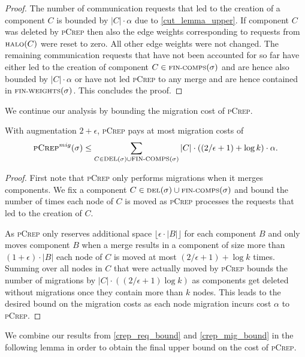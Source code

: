 \documentclass[a4paper,UKenglish,cleveref, autoref, thm-restate,authorcolumns]{lipics-v2019}
\newcommand{\adjDel}{\textsc{pCrep}}
\newcommand{\del}{\text{\scriptsize DEL}}
\newcommand{\halo}{\text{\scriptsize HALO}}
\newcommand{\finalComps}{\text{\scriptsize FIN-COMPS}}
\newcommand{\finalWeights}{\text{\scriptsize FIN-WEIGHTS}}
\begin{document}
\begin{proof}
	The number of communication requests that led to the creation of a component $C$ is bounded by $|C|\cdot\alpha$ due to \cref{cut_lemma_upper}.
	If component $C$ was deleted by \adjDel{} then also the edge weights corresponding to requests from $\halo(C)$ were reset to zero. All other edge weights were not changed. The remaining communication requests that have not been accounted for so far have either led to the creation of component $C\in\finalComps(\sigma)$ and are hence also bounded by $|C|\cdot\alpha$ or have not led \adjDel{} to any merge and are hence contained in $\finalWeights(\sigma)$. This concludes the proof.
\end{proof}

We continue our analysis by bounding the migration cost of \adjDel{}.

\begin{lemma}
	\label{crep_mig_bound}
	With augmentation $2+\epsilon$, \adjDel{} pays at most migration costs of
	\begin{align*}
	\adjDel^{mig}(\sigma)\leq\sum_{C\in\del{}(\sigma)\cup\finalComps(\sigma)}|C|\cdot((2/\epsilon+1)+\log k)\cdot\alpha.
	\end{align*}
\end{lemma}

\begin{proof}
	First note that \adjDel{} only performs migrations when it merges components.
	We fix a component $C\in\del{}(\sigma)\cup \finalComps(\sigma)$ and bound the number of times each node of $C$ is moved as \adjDel{} processes the requests that led to the creation of $C$. 
	
	As \adjDel{} only reserves additional space $\lfloor\epsilon\cdot|B|\rfloor$ for each component $B$ and only moves component $B$ when a merge results in a component of size more than $(1+\epsilon)\cdot|B|$ each node of $C$ is moved at most
	$(2/\epsilon+1)+\log k$ times. Summing over all nodes in $C$ that were actually moved by \adjDel{} bounds the number of migrations by $|C|\cdot((2/\epsilon+1) \log k)$ as components get deleted without migrations once they contain more than $k$ nodes. This leads to the desired bound on the migration costs as each node migration incurs cost $\alpha$ to \adjDel{}.
\end{proof}


We combine our results from \cref{crep_req_bound} and \cref{crep_mig_bound} in the following lemma in order to obtain the final upper bound on the cost of \adjDel{}.
\end{document}
